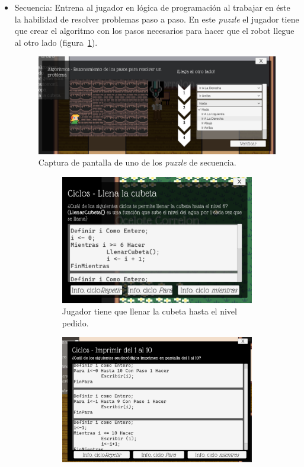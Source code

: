 \begin{itemize}
    \item Secuencia: Entrena al jugador en lógica de programación al trabajar en éste la habilidad de resolver problemas paso a paso. En este \textit{puzzle} el jugador tiene que crear el algoritmo con los pasos necesarios para hacer que el robot llegue al otro lado (figura~\ref{fig:puzzle_secuencia}).
    \begin{figure}[H]
        \centering
        \includegraphics[width=0.5\linewidth]{images/PuzzleSecuencia.png}
        \caption{Captura de pantalla de uno de los \textit{puzzle} de secuencia.}
        \label{fig:puzzle_secuencia}
    \end{figure}
    \begin{figure}[H]
            \centering
        \begin{subfigure}{0.4\textwidth}
            \centering
            \includegraphics[width=\textwidth]{images/OpcionMultiple1.png}
            \caption{Jugador tiene que llenar la cubeta hasta el nivel pedido.}
            \label{fig:puzzle_completar_ciclos_for}
        \end{subfigure}
        \begin{subfigure}{0.4\textwidth}
            \centering
            \includegraphics[width=\textwidth]{images/OpcionMultiple2.png}

\end{subfigure}
\end{figure}
\end{itemize}
